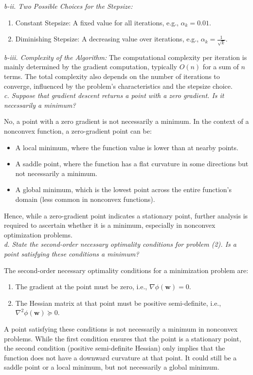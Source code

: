 \documentclass[12pt]{article}
\begin{document}
    \textit{b-ii. Two Possible Choices for the Stepsize:}
    \begin{enumerate}
        \item Constant Stepsize: A fixed value for all iterations, e.g., \(\alpha_k = 0.01\).
        \item Diminishing Stepsize: A decreasing value over iterations, e.g., \(\alpha_k = \frac{1}{\sqrt{k}}\).
    \end{enumerate}

    \textit{b-iii. Complexity of the Algorithm:}
    The computational complexity per iteration is mainly determined by the gradient computation, typically \(O(n)\) for a sum of \(n\) terms. The total complexity also depends on the number of iterations to converge, influenced by the problem's characteristics and the stepsize choice.\\

    \textit{c. Suppose that gradient descent returns a point with a zero gradient. Is it necessarily a minimum?}

    No, a point with a zero gradient is not necessarily a minimum. In the context of a nonconvex function, a zero-gradient point can be:
    \begin{itemize}
        \item A local minimum, where the function value is lower than at nearby points.
        \item A saddle point, where the function has a flat curvature in some directions but not necessarily a minimum.
        \item A global minimum, which is the lowest point across the entire function's domain (less common in nonconvex functions).
    \end{itemize}
    Hence, while a zero-gradient point indicates a stationary point, further analysis is required to ascertain whether it is a minimum, especially in nonconvex optimization problems.\\

    \textit{d. State the second-order necessary optimality conditions for problem (2). Is a point satisfying these conditions a minimum?}

    The second-order necessary optimality conditions for a minimization problem are:
    \begin{enumerate}
        \item The gradient at the point must be zero, i.e., \(\nabla \phi(\boldsymbol{w}) = 0\).
        \item The Hessian matrix at that point must be positive semi-definite, i.e., \(\nabla^2 \phi(\boldsymbol{w}) \succeq 0\).
    \end{enumerate}
    A point satisfying these conditions is not necessarily a minimum in nonconvex problems. While the first condition ensures that the point is a stationary point, the second condition (positive semi-definite Hessian) only implies that the function does not have a downward curvature at that point. It could still be a saddle point or a local minimum, but not necessarily a global minimum.\\
\end{document}
